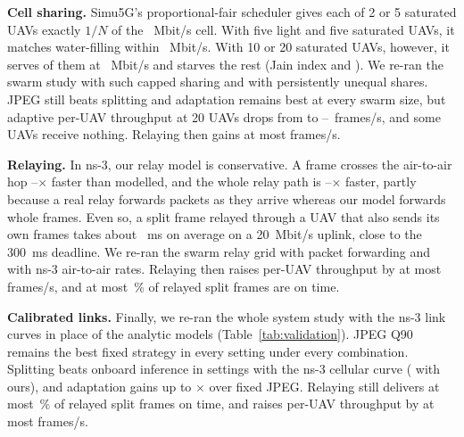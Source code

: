 \documentclass[journal,twocolumn,10pt]{IEEEtran}
\begin{document}
\textbf{Cell sharing.} Simu5G's proportional-fair scheduler gives each of 2 or 5 saturated UAVs exactly $1/N$ of the \ValShareCell~Mbit/s cell. With five light and five saturated UAVs, it matches water-filling within \ValMixedMaxErr~Mbit/s. With 10 or 20 saturated UAVs, however, it serves \ValSharePfServed{} of them at \ValSharePfRate~Mbit/s and starves the rest (Jain index \ValShareJainTen{} and \ValShareJainTwenty). We re-ran the swarm study with such capped sharing and with persistently unequal shares. JPEG still beats splitting and adaptation remains best at every swarm size, but adaptive per-UAV throughput at 20 UAVs drops from \ValShareAdTwentyFair{} to \ValShareAdTwentyMin--\ValShareAdTwentyMax~frames/s, and some UAVs receive nothing. Relaying then gains at most \ValShareRelayGainMax{} frames/s.

\textbf{Relaying.} In ns-3, our relay model is conservative. A frame crosses the air-to-air hop \ValRelayHopMin--\ValRelayHopMax$\times$ faster than modelled, and the whole relay path is \ValRelayPathMin--\ValRelayPathMax$\times$ faster, partly because a real relay forwards packets as they arrive whereas our model forwards whole frames. Even so, a split frame relayed through a UAV that also sends its own frames takes about \ValRelaySplitOwnMs~ms on average on a 20~Mbit/s uplink, close to the 300~ms deadline. We re-ran the swarm relay grid with packet forwarding and with ns-3 air-to-air rates. Relaying then raises per-UAV throughput by at most \ValRelayFwdGainMax{} frames/s, and at most \ValRelayFwdSplitPct\,\% of relayed split frames are on time.

\textbf{Calibrated links.} Finally, we re-ran the whole system study with the ns-3 link curves in place of the analytic models (Table~\ref{tab:validation}). JPEG Q90 remains the best fixed strategy in every setting under every combination. Splitting beats onboard inference in \ValCalLteSplitBeatsOnboard{} settings with the ns-3 cellular curve (\ValCalDefaultSplitBeatsOnboard{} with ours), and adaptation gains up to \ValCalAdaptiveAllMax$\times$ over fixed JPEG. Relaying still delivers at most \ValCalRelaySplitPctMax\,\% of relayed split frames on time, and raises per-UAV throughput by at most \ValCalRelayGainMax{} frames/s.

\begin{table}[t]
\centering
\caption{System-level conclusions with the paper's analytic link models and with link models calibrated to ns-3 (cellular: LTE uplink; A2A: 802.11ax), 16 settings of channel profile and onboard speed, and the swarm grid.}
\label{tab:validation}
\resizebox{\columnwidth}{!}{}
\end{table}
\end{document}
